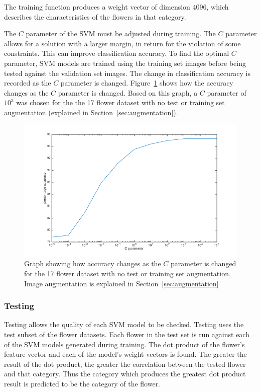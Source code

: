 \documentclass[11pt, a4paper]{report}
\begin{document}
The training function produces a weight vector of dimension 4096, which describes the characteristics of the flowers in that category. 

The $C$ parameter of the SVM must be adjusted during training. The $C$ parameter allows for a solution with a larger margin, in return for the violation of some constraints. This can improve classification accuracy. To find the optimal $C$ parameter, SVM models are trained using the training set images  before being tested against the validation set images. The change in classification accuracy is recorded as the $C$ parameter is changed. Figure~\ref{img:27} shows how the accuracy changes as the $C$ parameter is changed. Based on this graph, a $C$ parameter of $10^3$ was chosen for the the 17 flower dataset with no test or training set augmentation (explained in Section~\ref{sec:augmentation}). 

\begin{figure}[hbt]
	\centering
  \includegraphics[totalheight=10cm]{img/27.png}
  \caption{Graph showing how accuracy changes as the $C$ parameter is changed for the 17 flower dataset with no test or training set augmentation. Image augmentation is explained in Section~\ref{sec:augmentation} }
  \label{img:27}
\end{figure}

\subsubsection{Testing}

Testing allows the quality of each SVM model to be checked. Testing uses the test subset of the flower datasets. Each flower in the test set is run against each of the SVM models generated during training. The dot product of the  flower's feature vector and each of the model's weight vectors is found. The greater the result of the dot product, the greater the correlation between the tested flower and that category. Thus the category which produces the greatest dot product result is predicted to be the category of the flower.
\end{document}
